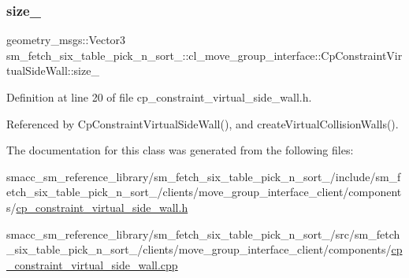 \subsubsection{\texorpdfstring{size\+\_\+}{size\_}}
{\footnotesize\ttfamily geometry\+\_\+msgs\+::\+Vector3 sm\+\_\+fetch\+\_\+six\+\_\+table\+\_\+pick\+\_\+n\+\_\+sort\+\_\+::cl\+\_\+move\+\_\+group\+\_\+interface\+::\+Cp\+Constraint\+Virtual\+Side\+Wall\+::size\+\_\+\hspace{0.3cm}{\ttfamily [private]}}



Definition at line 20 of file cp\+\_\+constraint\+\_\+virtual\+\_\+side\+\_\+wall.\+h.



Referenced by Cp\+Constraint\+Virtual\+Side\+Wall(), and create\+Virtual\+Collision\+Walls().



The documentation for this class was generated from the following files\+:\begin{DoxyCompactItemize}
\item 
smacc\+\_\+sm\+\_\+reference\+\_\+library/sm\+\_\+fetch\+\_\+six\+\_\+table\+\_\+pick\+\_\+n\+\_\+sort\+\_/include/sm\+\_\+fetch\+\_\+six\+\_\+table\+\_\+pick\+\_\+n\+\_\+sort\+\_/clients/move\+\_\+group\+\_\+interface\+\_\+client/components/\hyperlink{cp__constraint__virtual__side__wall_8h}{cp\+\_\+constraint\+\_\+virtual\+\_\+side\+\_\+wall.\+h}\item 
smacc\+\_\+sm\+\_\+reference\+\_\+library/sm\+\_\+fetch\+\_\+six\+\_\+table\+\_\+pick\+\_\+n\+\_\+sort\+\_/src/sm\+\_\+fetch\+\_\+six\+\_\+table\+\_\+pick\+\_\+n\+\_\+sort\+\_/clients/move\+\_\+group\+\_\+interface\+\_\+client/components/\hyperlink{cp__constraint__virtual__side__wall_8cpp}{cp\+\_\+constraint\+\_\+virtual\+\_\+side\+\_\+wall.\+cpp}\end{DoxyCompactItemize}
